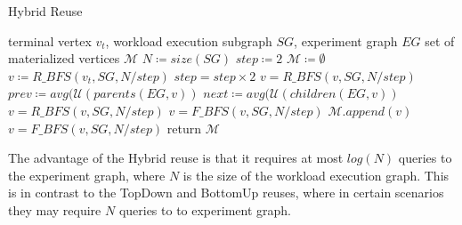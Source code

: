 \begin{algorithm}[h]
\caption{Hybrid Reuse}\label{algorithm-hybrid}
\begin{algorithmic}[1]
\Require terminal vertex $v_t$, workload execution subgraph  $SG$, experiment graph $EG$ 
\Ensure set of materialized vertices $\mathcal{M}$ 
\State $N \coloneqq size(SG)$
\State $step \coloneqq 2$
\State $\mathcal{M} \coloneqq \emptyset$
\State $v \coloneqq R\_BFS(v_t, SG, N/step)$
		\State $step = step \times 2$
				\State $v = R\_BFS(v, SG, N/step)$
				\State $prev \coloneqq avg (\mathcal{U}(parents(EG, v))$
				\State $next \coloneqq avg (\mathcal{U}(children(EG, v))$
						 \State $v = R\_BFS(v, SG, N/step)$
				\Else
					\State $v = F\_BFS(v, SG, N/step)$
				\EndIf
				\State $\mathcal{M}.append(v)$
				\State $v = F\_BFS(v, SG, N/step)$
		\EndIf
\EndWhile
\State return $\mathcal{M}$
\end{algorithmic}
\end{algorithm}
The advantage of the Hybrid reuse is that it requires at most $log(N)$ queries to the experiment graph, where $N$ is the size of the workload execution graph.
This is in contrast to the TopDown and BottomUp reuses, where in certain scenarios they may require $N$ queries to to experiment graph.


